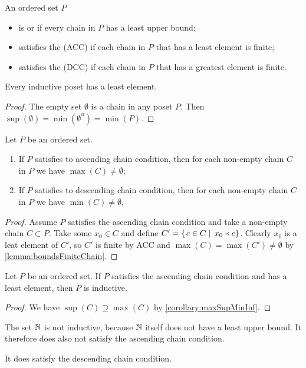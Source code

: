 \begin{definition}
An ordered set $P$
\begin{itemize}
\item is  or  if every chain in $P$ has a least upper bound;
\item satisfies the  (ACC) if each chain in $P$ that has a least element is finite;
\item satisfies the  (DCC) if each chain in $P$ that has a greatest element is finite.
\end{itemize}
\end{definition}

\begin{lemma}
Every inductive poset has a least element.
\end{lemma}
\begin{proof}
The empty set $\emptyset$ is a chain in any poset $P$. Then $\sup(\emptyset) = \min(\emptyset^u) = \min(P)$.
\end{proof}

\begin{lemma}
Let $P$ be an ordered set.
\begin{enumerate}
\item If $P$ satisfies to ascending chain condition, then for each non-empty chain $C$ in $P$ we have $\max(C) \neq \emptyset$;
\item If $P$ satisfies to descending chain condition, then for each non-empty chain $C$ in $P$ we have $\min(C) \neq \emptyset$,
\end{enumerate}
\end{lemma}
\begin{proof}
Assume $P$ satisfies the ascending chain condition and take a non-empty chain $C\subset P$. Take some $x_0\in C$ and define $C' = \left\{\left. c\in C \;\right|\; x_0 \Yleft c \right\}$. Clearly $x_0$ is a leat element of $C'$, so $C'$ is finite by ACC and $\max(C) = \max(C') \neq \emptyset$ by \ref{lemma:boundsFiniteChain}.
\end{proof}
\begin{corollary}
Let $P$ be an ordered set. If $P$ satisfies the ascending chain condition and has a least element, then $P$ is inductive.
\end{corollary}
\begin{proof}
We have $\sup(C) \supseteq \max(C)$ by \ref{corollary:maxSupMinInf}.
\end{proof}

\begin{example}
The set $\mathbb{N}$ is not inductive, because $\mathbb{N}$ itself does not have a least upper bound. It therefore does also not satisfy the ascending chain condition.

It does satisfy the descending chain condition.
\end{example}


